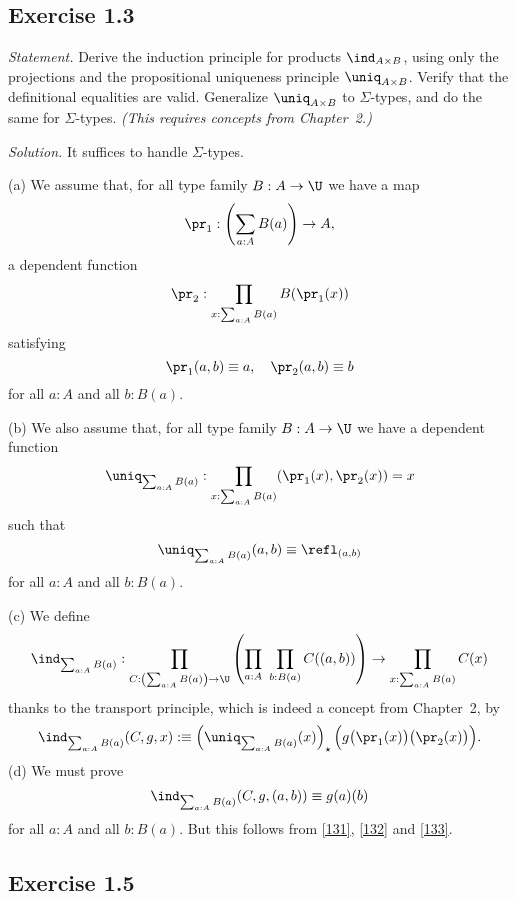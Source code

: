 \documentclass[12pt]{article}
\begin{document}
%

\subsection{Exercise 1.3} 

\emph{Statement.} Derive the induction principle for products $\ind_{A\times B}$, using only the projections and the propositional uniqueness principle $\uniq_{A\times B}$. Verify that the definitional equalities are valid. Generalize $\uniq_{A\times B}$ to $\Sigma$-types, and do the same for $\Sigma$-types. \emph{(This requires concepts from Chapter~2.)}

\nn\emph{Solution.} It suffices to handle $\Sigma$-types. 

\nn(a) We assume that, for all type family $B:A\to\U$ we have a map 
$$
\pr_1:\left(\sum_{a:A}B(a)\right)\to A,
$$ 
a dependent function 
$$
\pr_2:\prod_{x:\sum_{a:A}B(a)}B(\pr_1(x))
$$
satisfying
\begin{equation}\label{131}
\pr_1(a,b)\equiv a,\quad\pr_2(a,b)\equiv b
\end{equation}
for all $a:A$ and all $b:B(a)$.

\nn(b) We also assume that, for all type family $B:A\to\U$ we have a dependent function 
$$
\uniq_{\sum_{a:A}B(a)}:\prod_{x:\sum_{a:A}B(a)}(\pr_1(x),\pr_2(x))=x
$$ 
such that 
\begin{equation}\label{132}
\uniq_{\sum_{a:A}B(a)}(a,b)\equiv\refl_{(a,b)}
\end{equation}
for all $a:A$ and all $b:B(a)$. 

\nn(c) We define
$$
\ind_{\sum_{a:A}B(a)}:\prod_{C:\left(\sum_{a:A}B(a)\right)\to\U} 
\left(\prod_{a:A}\ \prod_{b:B(a)}C((a,b))\right) 
\to\prod_{x:\sum_{a:A}B(a)}C(x)
$$
thanks to the transport principle, which is indeed a concept from Chapter~2, by
\begin{equation}\label{133}
\ind_{\sum_{a:A}B(a)}(C,g,x):\equiv\left(\uniq_{\sum_{a:A}B(a)}(x)\right)_\star\Big(g\big(\pr_1(x)\big)\big(\pr_2(x)\big)\Big).
\end{equation}
(d) We must prove 
$$
\ind_{\sum_{a:A}B(a)}(C,g,(a,b))\equiv g(a)(b)
$$
for all $a:A$ and all $b:B(a)$. But this follows from \eqref{131}, \eqref{132} and \eqref{133}.


\subsection{Exercise 1.5}
\end{document}

